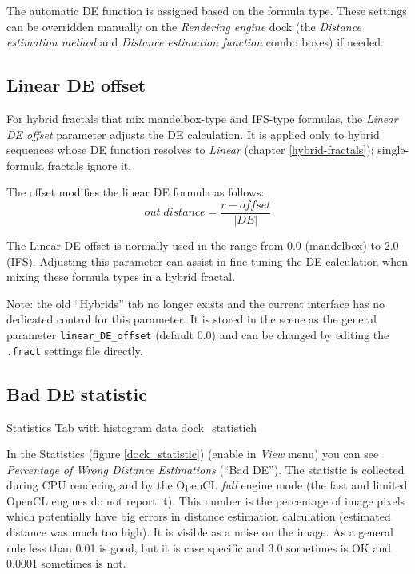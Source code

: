 The automatic DE function is assigned based on the formula type. These settings can be overridden manually on the \emph{Rendering engine} dock (the \emph{Distance estimation method} and \emph{Distance estimation function} combo boxes) if needed.

\subsection{Linear DE offset}\label{linear-de-offset}

For hybrid fractals that mix mandelbox-type and IFS-type formulas, the \emph{Linear DE offset} parameter adjusts the DE calculation. It is applied only to hybrid sequences whose DE function resolves to \emph{Linear} (chapter \ref{hybrid-fractals}); single-formula fractals ignore it.

The offset modifies the linear DE formula as follows:
\[ out.distance = \frac{r - offset}{\lvert DE \rvert} \]

The Linear DE offset is normally used in the range from 0.0 (mandelbox) to 2.0 (IFS). Adjusting this parameter can assist in fine-tuning the DE calculation when mixing these formula types in a hybrid fractal.

Note: the old ``Hybrids'' tab no longer exists and the current interface has no dedicated control for this parameter. It is stored in the scene as the general parameter \texttt{linear\_DE\_offset} (default 0.0) and can be changed by editing the \texttt{.fract} settings file directly.

\subsection{Bad DE statistic}\label{bad-de-statistic}

{Statistics Tab with histogram data}
{dock_statistic}{h}

In the Statistics (figure \ref{dock_statistic}) (enable in \emph{View} menu) you can see \emph{Percentage of
	Wrong Distance Estimations} (``Bad DE''). The statistic is collected during CPU rendering and by the OpenCL \emph{full} engine mode (the fast and limited OpenCL engines do not report it). This number is the percentage of image
pixels which potentially have big errors in distance estimation calculation
(estimated distance was much too high). It is visible as a noise on the image.
As a general rule less than 0.01 is good, but it is case specific and 3.0
sometimes is OK and 0.0001 sometimes is not.

